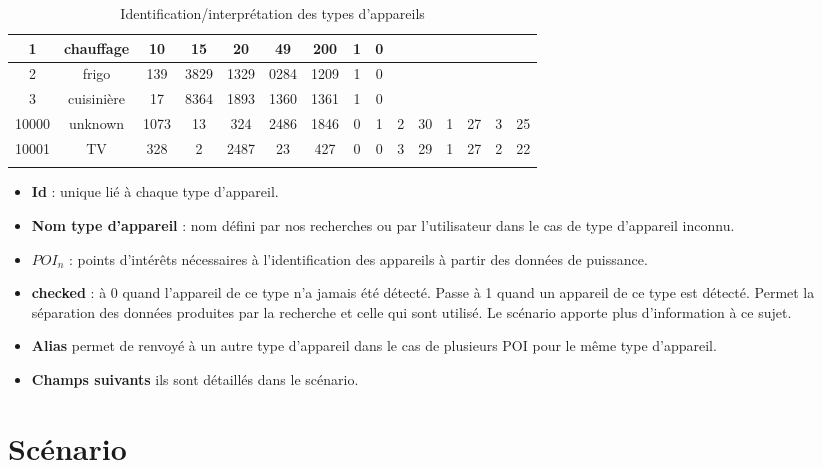 \documentclass[10pt,a4paper]{article}
\begin{document}
\begin{enumerate}
\begin{table}[h]
{\begin{tabular}{|c|c|c|c|c|c|c|c|c|c|c|c|c|c|c|}
1 & chauffage & 10 & 15 & 20 & 49 & 200 & 1 & 0 &  &  &  &  &  &  \\ \hline
2 & frigo & 139 & 3829 & 1329 & 0284 & 1209 & 1 & 0 &  &  &  &  &  &  \\ \hline
3 & cuisinière & 17 & 8364 & 1893 & 1360 & 1361 & 1 & 0  &  &  &  &  &  &  \\ \hline
10000 & unknown & 1073 & 13 & 324 & 2486 & 1846 & 0 & 1 & 2 & 30 & 1 & 27 & 3 & 25 \\ \hline
10001 & TV & 328 & 2 & 2487 & 23 & 427 & 0 & 0 & 3 & 29 & 1 & 27 & 2 & 22 \\ \hline
 &  &  &  &  &  &  &  &  &  &  &  &  &  & 
\end{tabular}
}
\caption{Identification/interprétation des types d'appareils}
\end{table} 
\begin{itemize}
\item \textbf{Id} : unique lié à chaque type d'appareil.
\item \textbf{Nom type d'appareil} : nom défini par nos recherches ou par l'utilisateur dans le cas de type d'appareil inconnu.
\item \textbf{$POI_n$} : points d'intérêts nécessaires à l'identification des appareils à partir des données de puissance.
\item \textbf{checked} : à 0 quand l'appareil de ce type n'a jamais été détecté. Passe à 1 quand un appareil de ce type est détecté. Permet la séparation des données produites par la recherche et celle qui sont utilisé. Le scénario apporte plus d'information à ce sujet.
\item \textbf{Alias} permet de renvoyé à un autre type d'appareil dans le cas de plusieurs POI pour le même type d'appareil.
\item \textbf{Champs suivants} ils sont détaillés dans le scénario.
\end{itemize}
\end{enumerate}
\newpage
\section{Scénario}
\end{document}
